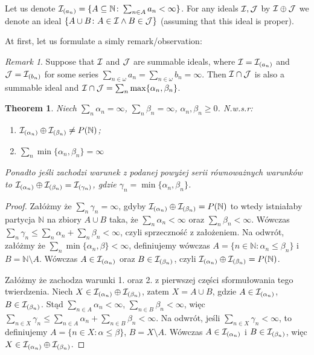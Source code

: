 \documentclass[12pt]{article}
\theoremstyle{plain}
\newtheorem{theorem}{Theorem}[section]
\theoremstyle{definition}
\theoremstyle{remark}
\newtheorem*{remark}{Remark}
\newcommand{\nnatural}{\mathbb{N}}
\newcommand{\cI}{{\cal I}}
\newcommand{\cJ}{{\cal J}}
\begin{document}
Let us denote
  $\cI_{(a_n)} = \{ A \subseteq \nnatural\colon \sum_{n\in A} a_n < \infty\}$.
For any ideals $\cI, \cJ$ by $\cI \oplus \cJ$ we denote
an ideal $\{A \cup B\colon A \in \cI \wedge B \in \cJ\}$ 
(assuming that this ideal is proper).

At first, let us formulate a simly remark/observation:
\begin{remark}
Suppose that $\cI$ and $\cJ$ are summable ideals, where
$\cI = \cI_{(a_n)}$ and $\cJ = \cI_{(b_n)}$ for some
series $\sum_{n\in\omega} a_n = \sum_{n\in\omega} b_n = \infty$.
Then $\cI \cap \cJ$ is also a summable ideal and
$\cI \cap \cJ = \sum_n \max\{\alpha_n,\beta_n\}$.
\end{remark}

\begin{theorem}
Niech $\sum_n \alpha_n = \infty$, $\sum_n \beta_n = \infty$,
$\alpha_n, \beta_n \geq 0$. N.w.s.r:
\begin{enumerate}
\item
  $\cI_{(\alpha_n)} \oplus \cI_{(\beta_n)} \not = P(\nnatural)$;
\item
  $\sum_n \min\{\alpha_n,\beta_n\} = \infty$
\end{enumerate}
Ponadto jeśli zachodzi warunek z podanej powyżej serii równoważnych warunków
to $\cI_{(\alpha_n)} \oplus \cI_{(\beta_n)} = \cI_{(\gamma_n)}$,
gdzie $\gamma_n = \min\{\alpha_n,\beta_n\}$.
\end{theorem}
\begin{proof}
Załóżmy że $\sum_n \gamma_n = \infty$, gdyby 
$\cI_{(\alpha_n)} \oplus \cI_{(\beta_n)} = P(\nnatural)$ to wtedy
istniałaby partycja $\nnatural$ na zbiory $A \cup B$ taka, że 
$\sum_n \alpha_n < \infty$ oraz $\sum_n \beta_n < \infty$.
Wówczas $\sum_n \gamma_n \leq \sum_n \alpha_n + \sum_n \beta_n < \infty$,
czyli sprzeczność z założeniem. 
Na odwrót, załóżmy że $\sum_n \min\{\alpha_n,\beta\} < \infty$,
definiujemy wówczas $A = \{n \in \nnatural \colon \alpha_n \leq \beta_n\}$
i $B = \nnatural \setminus A$. Wówczas 
$A \in \cI_{(\alpha_n)}$ oraz $B \in \cI_{(\beta_n)}$, czyli 
$\cI_{(\alpha_n)} \oplus \cI_{(\beta_n)} = P(\nnatural)$.
  
Załóżmy że zachodza warunki 1. oraz 2. z pierwszej części 
sformułowania tego twierdzenia. Niech 
$X \in \cI_{(\alpha_n)} \oplus \cI_{(\beta_n)}$, zatem
$X = A \cup B$, gdzie $A \in \cI_{(\alpha_n)}$,
$B \in \cI_{(\beta_n)}$. Stąd $\sum_{n\in A} \alpha_n < \infty$, 
$\sum_{n\in B} \beta_n < \infty$, więc 
$\sum_{n\in X} \gamma_n \leq \sum_{n\in A} \alpha_n + \sum_{n\in B} \beta_n < \infty$.
Na odwrót, jeśli $\sum_{n\in X} \gamma_n < \infty$, to 
definiujemy $A = \{n\in X\colon \alpha \leq \beta \}$,
$B = X \setminus A$. Wówczas $A \in \cI_{(\alpha_n)}$ i
$B \in \cI_{(\beta_n)}$, więc 
$X\in\cI_{(\alpha_n)} \oplus \cI_{(\beta_n)}$.
\end{proof}
\end{document}
